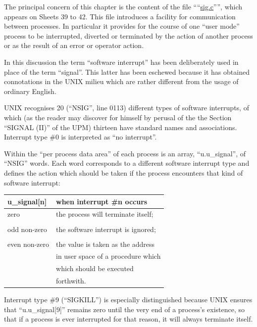 %
%

The principal concern of this chapter
is the content of the file ````\href{./v6/ken/sig.c}{sig.c}'''',
which appears on Sheets 39 to 42. This
file introduces a facility for communication between processes. In particular
it provides for the course of one ``user
mode'' process to be interrupted,
diverted or terminated by the action of
another process or as the result of an
error or operator action.

In this discussion the term ``software
interrupt'' has been deliberately used
in place of the term ``signal''. This
latter has been eschewed because it has
obtained connotations in the UNIX
milieu which are rather different from
the usage of ordinary English.

UNIX recognises 20 (``NSIG'', line 0113)
different types of software interrupts,
of which (as the reader may discover
for himself by perusal of the the Section ``SIGNAL (II)'' of the UPM)
thirteen
have standard names and associations.
Interrupt type \#0 is interpreted as ``no
interrupt''.

Within the ``per process data area'' of
each process is an array, ``u.u\_signal'',
of ``NSIG'' words. Each word corresponds
to a different software interrupt type
and defines the action which should be
taken if the process encounters that
kind of software interrupt:

\begin{center}
\begin{tabular}{ll}
u\_signal[n] & when interrupt \#n occurs\\ \hline
zero & the process will terminate itself; \\
\\
odd non-zero & the software interrupt is ignored;\\
\\
even non-zero & the value is taken as the address\\
              & in user space of a procedure which\\
	      & which should be executed\\
	      & forthwith.\\
\end{tabular}
\end{center}

Interrupt type \#9 (``SIGKILL'') is especially distinguished
because UNIX ensures that ``u.u\_signal[9]'' remains
zero until the very end of a process's
existence, so that if a process is ever
interrupted for that reason, it will
always terminate itself.


